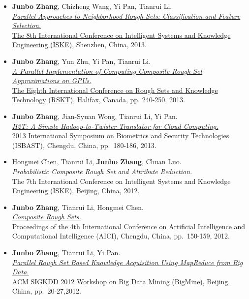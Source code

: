 \documentclass[]{article}
\begin{document}
\begin{itemize}
\item
  \textbf{Junbo Zhang}, Chizheng Wang, Yi Pan, Tianrui Li.\\
  \href{}{\emph{Parallel Approaches to Neighborhood Rough Sets:
  Classification and Feature Selection.}}\\
  \href{http://kjb.szu.edu.cn/iske/}{The 8th International Conference on
  Intelligent Systems and Knowledge Engineering (ISKE)}, Shenzhen,
  China, 2013.
\item
  \textbf{Junbo Zhang}, Yun Zhu, Yi Pan, Tianrui Li.\\ \href{}{\emph{A
  Parallel Implementation of Computing Composite Rough Set
  Approximations on GPUs.}}\\ \href{http://cs.smu.ca/jrs2013/}{The
  Eighth International Conference on Rough Sets and Knowledge Technology
  (RSKT)}, Halifax, Canada, pp. 240-250, 2013.
\item
  \textbf{Junbo Zhang}, Jian-Syuan Wong, Tianrui Li, Yi Pan.\\
  \href{http://dx.doi.org/10.1109/ISBAST.2013.32}{\emph{H2T: A Simple
  Hadoop-to-Twister Translator for Cloud Computing.}}\\ 2013
  International Symposium on Biometrics and Security Technologies
  (ISBAST)\emph{,} Chengdu, China, pp.~180-186, 2013.
\item
  Hongmei Chen, Tianrui Li, \textbf{Junbo Zhang}, Chuan Luo.\\
  \emph{Probabilistic Composite Rough Set and Attribute Reduction.}\\
  The 7th International Conference on Intelligent Systems and Knowledge
  Engineering (ISKE), Beijing, China, 2012.
\item
  \textbf{Junbo Zhang}, Tianrui Li, Hongmei Chen.\\
  \href{http://www.springerlink.com/content/g621611026534074/?MUD=MP}{\emph{Composite
  Rough Sets.}}\\ Proceedings of the 4th International Conference on
  Artificial Intelligence and Computational Intelligence (AICI),
  Chengdu, China, pp.~150-159, 2012.
\item
  \textbf{Junbo Zhang}, Tianrui Li, Yi Pan.\\
  \href{http://doi.acm.org/10.1145/2351316.2351320}{\emph{Parallel Rough
  Set Based Knowledge Acquisition Using MapReduce from Big Data.}}\\
  \href{http://kdd2012.sigkdd.org/workshops.shtml}{ACM SIGKDD 2012
  Workshop on Big Data Mining (BigMine)}, Beijing, China,
  pp.~20-27,2012.

\end{itemize}
\end{document}
